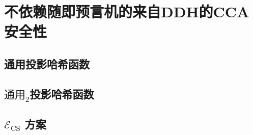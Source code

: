 \section{不依赖随即预言机的来自DDH的CCA安全性}\label{sec:12-5}

\subsection{通用投影哈希函数}\label{subsec:12-5-1}

\begin{lemma}\label{lemma:12-5}
	
\end{lemma}

\begin{game}[通用区分游戏]\label{game:12-4}
	
\end{game}

\begin{lemma}\label{lemma:12-6}
	
\end{lemma}

\subsection{$\text{通用}_2$投影哈希函数}\label{subsec:12-5-2}

\begin{lemma}\label{lemma:12-7}
	
\end{lemma}

\begin{game}\label{game:12-5}
	
\end{game}

\begin{lemma}\label{lemma:12-8}
	
\end{lemma}

\subsection{$\mathcal{E}_\mathrm{CS}$ 方案}\label{subsec:12-5-3}

\begin{theorem}\label{theo:12-9}
	
\end{theorem}

\begin{remark}[群元素验证]\label{remark:12-3}
	
\end{remark}